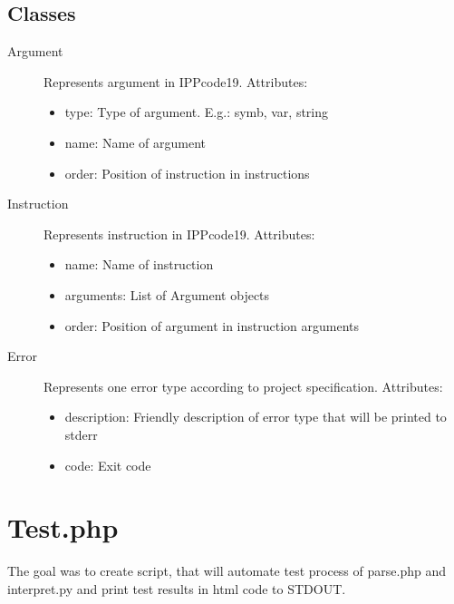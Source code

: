 \documentclass[10pt, a4paper]{article}
\begin{document}
\subsection*{Classes}
\begin{adjustwidth}{0.5cm}{}

\begin{description}
	\item[Argument]Represents argument in IPPcode19. Attributes:
	\begin{itemize}
		\item type: Type of argument. E.g.: symb, var, string
		\item name: Name of argument
		\item order: Position of instruction in instructions
	\end{itemize}		
\end{description}

\begin{description}
	\item[Instruction]Represents instruction in IPPcode19. Attributes:
	\begin{itemize}
		\item name: Name of instruction
		\item arguments: List of Argument objects
		\item order: Position of argument in instruction arguments
	\end{itemize}		
\end{description}


\begin{description}
	\item[Error]Represents one error type according to project specification. Attributes:
	\begin{itemize}
		\item description: Friendly description of error type that will be printed to stderr
		\item code: Exit code
	\end{itemize}		
\end{description}
\end{adjustwidth} 

\newpage 

\section*{Test.php}
The goal was to create script, that will automate test process of parse.php and interpret.py and print test results in html code to STDOUT.
\end{document}
